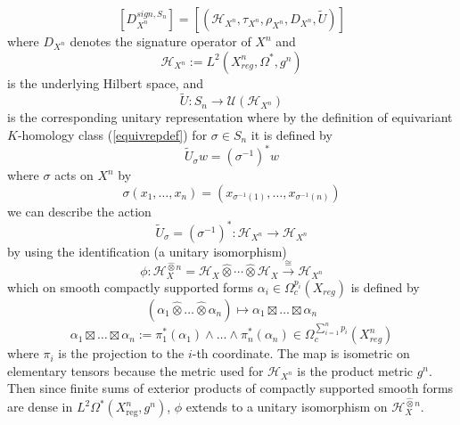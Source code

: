 \documentclass[11pt,leqno,twoside]{amsart}
\theoremstyle{plainsl}
\theoremstyle{definition}
\begin{document}
 
\[\left[D^{sign,S_n}_{X^n}\right]=[(\mathcal{H}_{X^n},\tau_{X^n},\rho_{X^n},D_{X^n},  \widetilde{U})]\]
where    $D_{X^n}$ denotes the  signature operator of $X^n$ and
\[\mathcal{H}_{X^n}:=L^2(X^n_{reg},\Omega^*, g^n)\]
is the underlying Hilbert space, and 
\[\widetilde{U}:S_n\rightarrow \mathcal{U}(\mathcal{H}_{X^n})\]
is the corresponding  unitary representation where  by the definition of equivariant  $K$-homology class (\ref{equivrepdef}) for $\sigma\in S_n$  it is defined by 
\begin{equation}
    \widetilde{U}_{\sigma} w=(\sigma^{-1})^*w
\end{equation}
where $\sigma$ acts on $X^n$ by 
 \[
\sigma(x_1,\ldots,x_n)
=
(x_{\sigma^{-1}(1)},\ldots,x_{\sigma^{-1}(n)})
\]
we can describe the action 
$$  \widetilde{U}_{\sigma}=(\sigma^{-1})^*:\mathcal{H}_{X^n} \rightarrow \mathcal{H}_{X^n}$$
by using the identification (a unitary isomorphism)
\begin{equation}\label{phiidentif}
    \phi: \mathcal{H}_X^{\widehat{\otimes}n}=\mathcal{H}_X\widehat{\otimes}
    \cdots\widehat{\otimes}\mathcal{H}_X \xrightarrow{\cong}\mathcal{H}_{X^n}
\end{equation}
which on smooth compactly supported forms $\alpha_i\in \Omega^{p_i}_{c}(X_{reg})$ is defined by  
\[(\alpha_1 \widehat{\otimes} \ldots \widehat{\otimes}\alpha_n)\mapsto \alpha_1\boxtimes \ldots \boxtimes \alpha_n
\]
\[\alpha_1\boxtimes \ldots \boxtimes \alpha_n:=\pi^*_1(\alpha_1)\wedge \ldots \wedge \pi^*_n(\alpha_n)\in \Omega_c^{\sum^n_{i=1} {p_i}}(X^n_{reg})\]
where $\pi_i$ is the projection to the $i$-th coordinate. The map is isometric on elementary tensors because the metric used for $\mathcal{H}_{X^n}$ is the product metric $g^n$. Then since finite sums of exterior products of compactly supported smooth forms are dense in $L^2\Omega^*(X^n_{\mathrm{reg}}, g^n)$, $\phi$  extends to a unitary isomorphism on $ \mathcal{H}_X^{\widehat{\otimes}n}$. 


\end{document}

